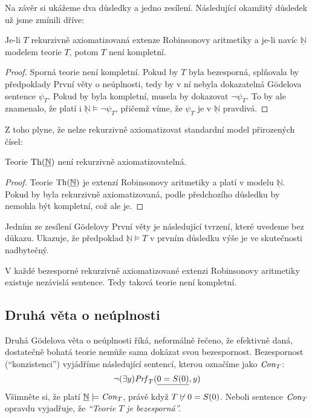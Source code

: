 Na závěr si ukážeme dva důsledky a jedno zesílení. Následující okamžitý důsledek už jsme zmínili dříve:

\begin{corollary}
Je-li $T$ rekurzivně axiomatizovaná extenze Robinsonovy aritmetiky a je-li navíc $\underline{\mathbb N}$ modelem teorie $T$, potom $T$ není kompletní.
\end{corollary}
\begin{proof}
Sporná teorie není kompletní. Pokud by $T$ byla bezesporná, splňovala by předpoklady První věty o neúplnosti, tedy by v ní nebyla dokazatelná Gödelova sentence $\psi_T$. Pokud by byla kompletní, musela by dokazovat $\neg\psi_T$. To by ale znamenalo, že platí i $\underline{\mathbb N}\models\neg\psi_T$, přičemž víme, že $\psi_T$ je v $\underline{\mathbb N}$ pravdivá.  
\end{proof}

Z toho plyne, že nelze rekurzivně axiomatizovat standardní model přirozených čísel:
\begin{corollary}
Teorie $\operatorname{Th}(\underline{\mathbb N})$ není rekurzivně axiomatizovatelná.    
\end{corollary}
\begin{proof}
Teorie $\operatorname{Th}(\underline{\mathbb N})$ je extenzí Robinsonovy aritmetiky a platí v modelu $\underline{\mathbb N}$. Pokud by byla rekurzivně axiomatizovaná, podle předchozího důsledku by nemohla být kompletní, což ale je.
\end{proof}

Jedním ze zesílení Gödelovy První věty je následující tvrzení, které uvedeme bez důkazu. Ukazuje, že předpoklad $\underline{\mathbb N}\models T$ v prvním důsledku výše je ve skutečnosti nadbytečný.

\begin{theorem}
V každé bezesporné rekurzivně axiomatizované extenzi Robinsonovy aritmetiky existuje nezávislá sentence. Tedy taková teorie není kompletní.    
\end{theorem}


\subsection{Druhá věta o neúplnosti}

Druhá Gödelova věta o neúplnosti říká, neformálně řečeno, že efektivně daná, dostatečně bohatá teorie nemůže sama dokázat svou bezespornost. Bezespornost (``konzistenci'') vyjádříme následující sentencí, kterou označíme jako $\mathit{Con}_T$:
$$
\neg(\exists y)\mathit{Prf}_T(\underline{0=S(0)},y)
$$
Všimněte si, že platí $\underline{\mathbb N}\models\mathit{Con}_T$, právě když $T\not\vdash 0=S(0)$. Neboli sentence $\mathit{Con}_T$ opravdu vyjadřuje, že \emph{``Teorie $T$ je bezesporná''.}

